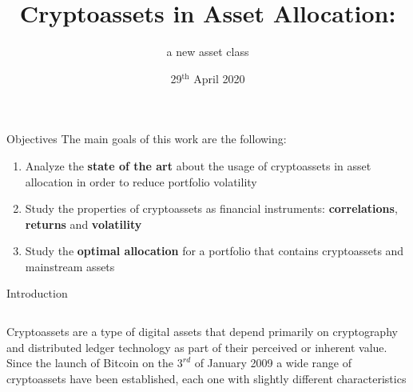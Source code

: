 \documentclass[c, 10pt]{beamer}
\title{Cryptoassets in Asset Allocation:}
\subtitle{a new asset class}
\author[Matteo Avigni]{%
	\usebox{\authbox}
}
\institute{School of Industrial and Information Engineering \\
	Master of Science in Mathematical Engineering}
\date{29$^{\text{th}}$ April 2020}
\begin{document}

    \begin{frame}
    	\bigskip
    	
    	\bigskip
    	
    	\bigskip
    	\large
        \maketitle
    \end{frame}
	
	\begin{frame}{Objectives}
	The main goals of this work are the following:
	\bigskip
	
		\begin{enumerate}
			\item Analyze the \textbf{state of the art} about the usage of cryptoassets in asset allocation in order to reduce portfolio volatility
			\bigskip
			
			\item Study the properties of cryptoassets as financial instruments: \textbf{correlations}, \textbf{returns} and \textbf{volatility}
			\bigskip
			\item Study the \textbf{optimal allocation} for a portfolio that contains cryptoassets and mainstream assets 
		\end{enumerate}
	\end{frame}


{
	\begin{frame}{Introduction}
		 \begin{columns}[T]
			Cryptoassets are a type of digital assets that depend primarily on cryptography and distributed ledger technology as part of their perceived or inherent value. Since the launch of Bitcoin on the $3^{rd}$ of January 2009 a wide range of cryptoassets have been established, each one with slightly different characteristics
		\end{columns}
	\end{frame}
}
\end{document}
